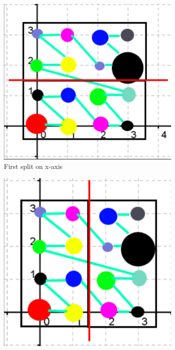 \documentclass[11pt,a4paper]{article}
\begin{document}
\begin{figure}[H]	
     \centering
     \begin{subfigure}[b]{0.3\textwidth}
         \centering
         \includegraphics[width=\textwidth]{images/example_lbvh/01.png}
         \caption{First split on x-axis}
         \label{fig:pi_4000}
     \end{subfigure}
     \hfill
     \begin{subfigure}[b]{0.3\textwidth}
         \centering
         \includegraphics[width=\textwidth]{images/example_lbvh/02.png}

\end{subfigure}
\end{figure}
\end{document}
